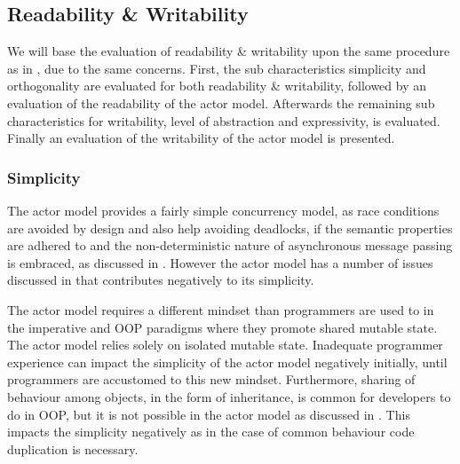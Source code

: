 \subsection{Readability \& Writability}
We will base the evaluation of readability \& writability upon the same procedure as in , due to the same concerns. First, the sub characteristics simplicity and orthogonality are evaluated for both readability \& writability, followed by an evaluation of the readability of the actor model. Afterwards the remaining sub characteristics for writability, level of abstraction and expressivity, is evaluated. Finally an evaluation of the writability of the actor model is presented.

\subsubsection{Simplicity}\label{subsec:actor_simplicity_read}
The actor model provides a fairly simple concurrency model, as race conditions are avoided by design and also help avoiding deadlocks, if the semantic properties are adhered to and the non-deterministic nature of asynchronous message passing is embraced, as discussed in . However the actor model has a number of issues discussed in  that contributes negatively to its simplicity.

The actor model requires a different mindset than programmers are used to in the imperative and \ac{OOP} paradigms where they promote shared mutable state. The actor model relies solely on isolated mutable state. Inadequate programmer experience can impact the simplicity of the actor model negatively initially, until programmers are accustomed to this new mindset. Furthermore, sharing of behaviour among objects, in the form of inheritance, is common for developers to do in \ac{OOP}, but it is not possible in the actor model as discussed in . This impacts the simplicity negatively as in the case of common behaviour code duplication is necessary.

